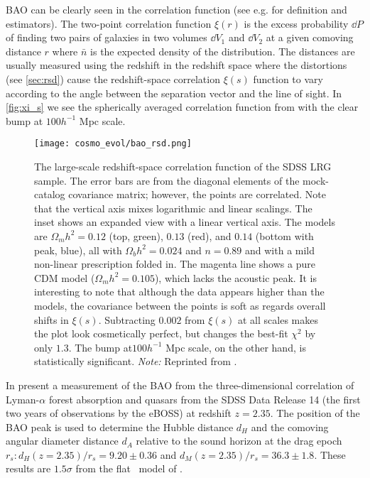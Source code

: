 BAO can be clearly seen in the correlation function (see e.g. \cite{1993ApJ...412...64L} for definition and estimators). The two-point correlation function $\xi(r)$ is the excess probability $\dd P$ of finding two pairs of galaxies in two volumes $\dd V_1$ and $\dd V_2$ at a given comoving distance $r$
where $\bar{n}$ is the expected density of the distribution. The distances are usually measured using the redshift in the redshift space where the distortions (see \autoref{sec:rsd}) cause the redshift-space correlation $\xi(s)$ function to vary according to the angle between the separation vector and the line of sight. In \autoref{fig:xi_s} we see the spherically averaged correlation function from \textcite{2005ApJ...633..560E} with the clear bump at $100h^{-1}$ Mpc scale.
\begin{figure}[hbt]
    \centering
    \texttt{[image: cosmo\_evol/bao\_rsd.png]}
    \caption{The large-scale redshift-space correlation function of the SDSS LRG sample. The error bars are from the diagonal elements of the mock-catalog covariance matrix; however, the points are correlated. Note that the vertical axis mixes logarithmic and linear scalings. The inset shows an expanded view with a linear vertical axis. The models are $\Omega_mh^2=0.12$ (top, green), $0.13$ (red), and $0.14$ (bottom with peak, blue), all with $\Omega_bh^2=0.024$ and $n=0.89$ and with a mild non-linear prescription folded in. The magenta line shows a pure CDM model ($\Omega_mh^2=0.105$), which lacks the acoustic peak. It is interesting to note that although the data appears higher than the models, the covariance between the points is soft as regards overall shifts in $\xi(s)$. Subtracting $0.002$ from $\xi(s)$ at all scales makes the plot look cosmetically perfect, but changes the best-fit $\chi^2$ by only $1.3$. The bump at$100h^{-1}$ Mpc scale, on the other hand, is statistically significant. \textit{Note:} Reprinted from \parencite{2005ApJ...633..560E}.}
    \label{fig:xi_s}
\end{figure}

In \textcite{BAO_results} present a measurement of the BAO from the three-dimensional correlation of Lyman-$\alpha$ forest absorption and quasars from the SDSS Data Release 14 (the first two years of observations by the eBOSS) at redshift $z=2.35$. The position of the BAO peak is used to determine the Hubble distance $d_H$ and the comoving angular diameter distance $d_A$ relative to the sound horizon at the drag epoch $r_s: d_H(z=2.35)/r_s = 9.20\pm0.36$ and $d_M(z=2.35)/r_s = 36.3\pm1.8$. These results are $1.5\sigma$ from the flat \LCDM\ model of \textcite{2016A&A...594A..13P}.
